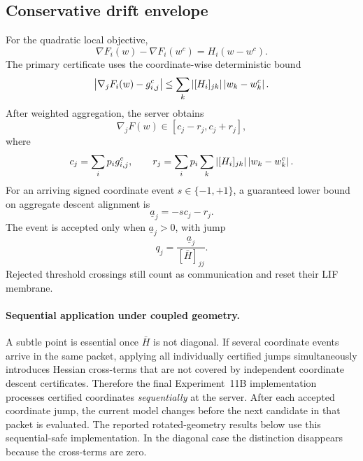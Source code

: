 \subsection{Conservative drift envelope}

For the quadratic local objective,
\begin{equation}
  \nabla F_i(w)-\nabla F_i(w^c)=H_i(w-w^c).
\end{equation}
The primary certificate uses the coordinate-wise deterministic bound
\begin{equation}
  \left|\nabla_jF_i(w)-g_{i,j}^c\right|
  \leq
  \sum_k \left|[H_i]_{jk}\right|\left|w_k-w_k^c\right|.
  \label{eq:11b-componentwise-bound}
\end{equation}
After weighted aggregation, the server obtains
\begin{equation}
  \nabla_jF(w)\in[c_j-r_j,c_j+r_j],
\end{equation}
where
\begin{equation}
  c_j=\sum_i p_i g_{i,j}^c,
  \qquad
  r_j=\sum_i p_i\sum_k\left|[H_i]_{jk}\right|\left|w_k-w_k^c\right|.
\end{equation}
For an arriving signed coordinate event $s\in\{-1,+1\}$, a guaranteed lower bound on aggregate descent alignment is
\begin{equation}
  \underline a_j=-s c_j-r_j.
\end{equation}
The event is accepted only when $\underline a_j>0$, with jump
\begin{equation}
  q_j=\frac{\underline a_j}{[\bar H]_{jj}}.
  \label{eq:11b-certified-jump}
\end{equation}
Rejected threshold crossings still count as communication and reset their LIF membrane.

\paragraph{Sequential application under coupled geometry.}
A subtle point is essential once $\bar H$ is not diagonal. If several coordinate events arrive in the same packet, applying all individually certified jumps simultaneously introduces Hessian cross-terms that are not covered by independent coordinate descent certificates. Therefore the final Experiment~11B implementation processes certified coordinates \emph{sequentially} at the server. After each accepted coordinate jump, the current model changes before the next candidate in that packet is evaluated. The reported rotated-geometry results below use this sequential-safe implementation. In the diagonal case the distinction disappears because the cross-terms are zero.

